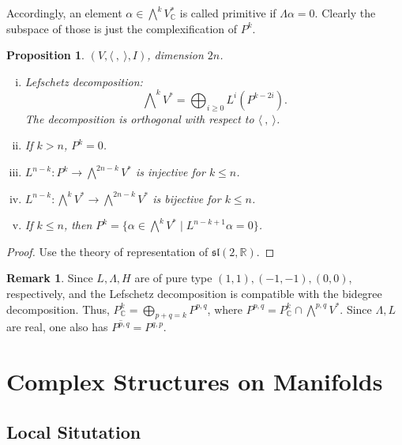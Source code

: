 \documentclass{article}
\theoremstyle{definition}
\newtheorem{remark}[definition]{Remark}
\theoremstyle{plain}
\newtheorem{proposition}[definition]{Proposition}
\begin{document}
Accordingly, an element $ \alpha\in\bigwedge^k V_{\mathbb{C}}^* $ is called primitive if $ \varLambda\alpha=0 $. Clearly the subspace of those is just the complexification of $ P^k $.

\begin{proposition}\label{prd}
    $ (V,\langle\ ,\ \rangle,I) $, dimension $ 2n $.
    \begin{enumerate}[(i)]
        \item Lefschetz decomposition:\begin{equation}
            \bigwedge\nolimits^k V^*=\bigoplus_{i\geqslant 0}L^i(P^{k-2i}).
        \end{equation}The decomposition is orthogonal with respect to $ \langle\ ,\ \rangle $.
        \item If $ k>n $, $ P^k=0 $.
        \item $ L^{n-k}:P^k\rightarrow \bigwedge^{2n-k}V^* $ is injective for $ k\leqslant n $.
        \item $ L^{n-k}:\bigwedge^k V^*\rightarrow \bigwedge^{2n-k}V^* $ is bijective for $ k\leqslant n $.
        \item If $ k\leqslant n $, then $ P^k=\{\alpha\in\bigwedge^k V^*\mid L^{n-k+1}\alpha=0\} $.
    \end{enumerate}
\end{proposition}

\begin{proof}
    Use the theory of representation of $ \mathfrak{sl}(2,\mathbb{R}) $.
\end{proof}

\begin{remark}
    Since $ L,\varLambda,H $ are of pure type $ (1,1),(-1,-1),(0,0) $, respectively, and the Lefschetz decomposition is compatible with the bidegree decomposition. Thus, $ P^k_{\mathbb{C}}=\bigoplus_{p+q=k}P^{p,q} $, where $ P^{p,q}=P^k_{\mathbb{C}}\cap\bigwedge^{p,q}V^* $. Since $ \varLambda,L $ are real, one also has $ \overline{P^{p,q}}=P^{q,p} $.
\end{remark}

\section{Complex Structures on Manifolds}

\subsection{Local Situtation}
\end{document}
